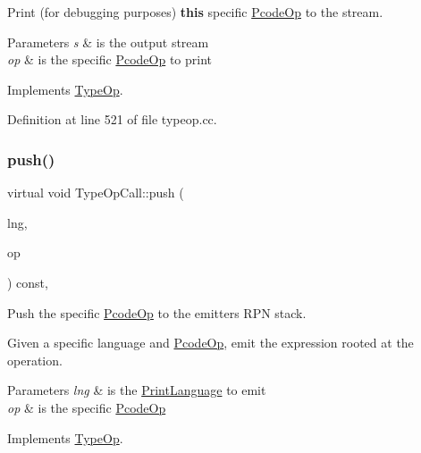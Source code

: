 Print (for debugging purposes) {\bfseries{this}} specific \mbox{\hyperlink{class_pcode_op}{Pcode\+Op}} to the stream. 


\begin{DoxyParams}{Parameters}
{\em s} & is the output stream \\
\hline
{\em op} & is the specific \mbox{\hyperlink{class_pcode_op}{Pcode\+Op}} to print \\
\hline
\end{DoxyParams}


Implements \mbox{\hyperlink{class_type_op_a60717e486917a30cc7cb6e3ce02585e1}{Type\+Op}}.



Definition at line 521 of file typeop.\+cc.

\mbox{\label{class_type_op_call_a8597152ff5c82ac28b9b9811cc5b4417}} 
\subsubsection{\texorpdfstring{push()}{push()}}
{\footnotesize\ttfamily virtual void Type\+Op\+Call\+::push (\begin{DoxyParamCaption}\item[{\mbox{\hyperlink{class_print_language}{Print\+Language}} $\ast$}]{lng,  }\item[{const \mbox{\hyperlink{class_pcode_op}{Pcode\+Op}} $\ast$}]{op }\end{DoxyParamCaption}) const\hspace{0.3cm}{\ttfamily [inline]}, {\ttfamily [virtual]}}



Push the specific \mbox{\hyperlink{class_pcode_op}{Pcode\+Op}} to the emitter\textquotesingle{}s R\+PN stack. 

Given a specific language and \mbox{\hyperlink{class_pcode_op}{Pcode\+Op}}, emit the expression rooted at the operation. 
\begin{DoxyParams}{Parameters}
{\em lng} & is the \mbox{\hyperlink{class_print_language}{Print\+Language}} to emit \\
\hline
{\em op} & is the specific \mbox{\hyperlink{class_pcode_op}{Pcode\+Op}} \\
\hline
\end{DoxyParams}


Implements \mbox{\hyperlink{class_type_op_ac9c9544203ed74dabe6ac662b653b2af}{Type\+Op}}.



